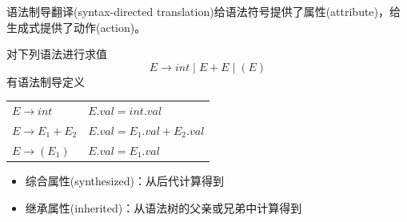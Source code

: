 语法制导翻译(syntax-directed translation)给语法符号提供了属性(attribute)，给生成式提供了动作(action)。
\begin{example}
对下列语法进行求值
\[E\to int\mid E+E\mid (E)\]
有语法制导定义
\begin{center}
\begin{tabular}{ll}
$E\to int$ & $E.val=int.val$\\
$E\to E_1+E_2$ & $E.val=E_1.val+E_2.val$\\
$E\to (E_1)$ & $E.val=E_1.val$
\end{tabular}
\end{center}
\end{example}

\begin{itemize}
\item 综合属性(synthesized)：从后代计算得到
\item 继承属性(inherited)：从语法树的父亲或兄弟中计算得到
\end{itemize}